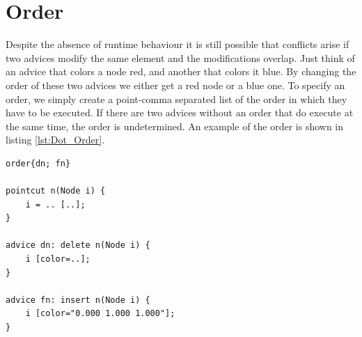 \documentclass[a4paper]{report}
\begin{document}
\section{Order}
Despite the absence of runtime behaviour it is still possible that conflicts arise if two advices modify the same element and the modifications overlap. Just think of an advice that colors a node red, and another that colors it blue. By changing the order of these two advices we either get a red node or a blue one. To specify an order, we simply create a point-comma separated list of the order in which they have to be executed. If there are two advices without an order that do execute at the same time, the order is undetermined. An example of the order is shown in listing \ref{lst:Dot_Order}.
\begin{lstlisting}[caption=An example of the order., label=lst:Dot_Order]
order{dn; fn}

pointcut n(Node i) {
	i = .. [..];
}

advice dn: delete n(Node i) {
	i [color=..];
}

advice fn: insert n(Node i) {
	i [color="0.000 1.000 1.000"];
}
\end{lstlisting}
\end{document}
